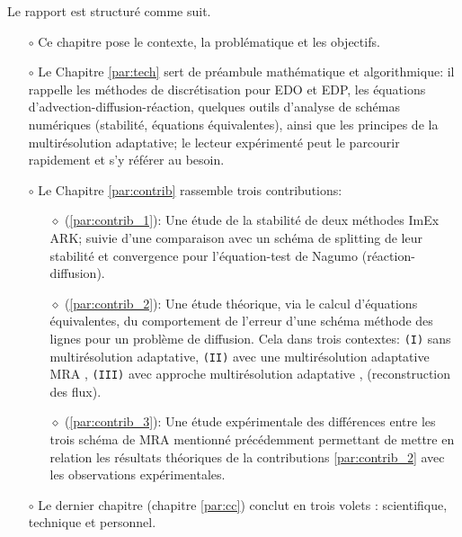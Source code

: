 Le rapport est structuré comme suit.
\begin{itemize}
\item[$\circ$] Ce chapitre pose le contexte, la problématique et les objectifs.
\item[$\circ$] Le Chapitre \ref{par:tech} sert de préambule mathématique et algorithmique:
il rappelle les méthodes de discrétisation pour EDO et EDP, les équations d'advection-diffusion-réaction, 
quelques outils d'analyse de schémas numériques (stabilité, équations équivalentes), ainsi que les principes de la multirésolution adaptative; 
le lecteur expérimenté peut le parcourir rapidement et s'y référer au besoin.
\item[$\circ$] Le Chapitre \ref{par:contrib} rassemble trois contributions:
\begin{itemize}
    \item[$\diamond$] (\ref{par:contrib_1}): Une étude de la stabilité de deux méthodes ImEx ARK;
    suivie d'une comparaison avec un schéma de splitting de leur stabilité et convergence pour l'équation-test de Nagumo (réaction-diffusion).
    \item[$\diamond$] (\ref{par:contrib_2}): Une étude théorique, via le calcul d'équations équivalentes, 
    du comportement de l'erreur d'une schéma méthode des lignes pour un problème de diffusion. 
    Cela dans trois contextes: 
    \texttt{(I)} sans multirésolution adaptative, 
    \texttt{(II)} avec une multirésolution adaptative MRA ,
    \texttt{(III)} avec approche multirésolution adaptative , (reconstruction des flux).
    \item[$\diamond$] (\ref{par:contrib_3}): Une étude expérimentale des différences entre les trois schéma de MRA mentionné précédemment 
    permettant de mettre en relation les résultats théoriques de la contributions \ref{par:contrib_2} avec les observations expérimentales.
\end{itemize}
\item[$\circ$] Le dernier chapitre (chapitre \ref{par:cc}) conclut en trois volets : scientifique, technique et personnel.
\end{itemize}